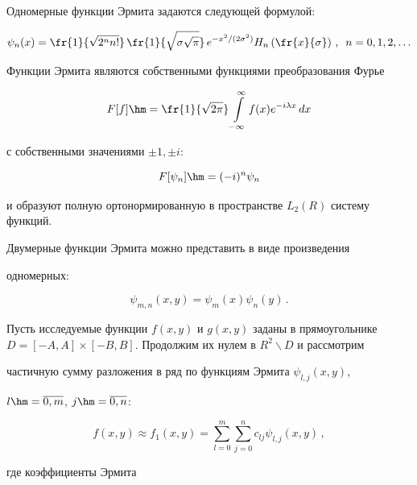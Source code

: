 Одномерные функции Эрмита задаются следующей формулой:


$$


\psi_n(x) =\fr{1}{\sqrt{2^n n!}}\, \fr{1}{\sqrt{\sigma\sqrt{\pi}}}\, 


e^{-x^2/(2\sigma^2)} H_n\left( \fr{x}{\sigma}\right)\,,\enskip n=0,1,2,\ldots


$$





Функции Эрмита являются собственными функциями преобразования Фурье 


$$


F[f]\hm=\fr{1}{\sqrt{2\pi}}\int\limits_{-\infty}^\infty f(x) e^{-i\lambda x}\,dx


$$ 


с собственными значениями $\pm 1, \pm i$: 


$$


F[\psi_n]\hm= (-i)^n\psi_n


$$


 и  образуют полную ортонормированную в пространстве $L_2 (R)$ систему функций.





Двумерные функции Эрмита можно представить в виде произведения 


одномерных:


$$


\psi_{m,n}(x,y)=\psi_m(x) \psi_n(y)\,.


$$





Пусть исследуемые функции $f(x,y)$ и $g(x,y)$ заданы в прямоугольнике $D=[-


A,A]\times [-B,B]$. Продолжим их нулем в $R^2\backslash D$ и рассмотрим 


частичную сумму разложения в ряд по функциям Эрмита $\psi_{l,j}(x,y)$, 


$l\hm= \overline{0,m}$, $j\hm=\overline{0,n}$:


\begin{equation}


f(x,y)\approx f_1(x,y) =\sum\limits_{l=0}^m \sum\limits_{j=0}^n c_{lj} 


\psi_{l,j}(x,y)\,,


\label{e1-pav}


\end{equation}


где коэффициенты Эрмита


